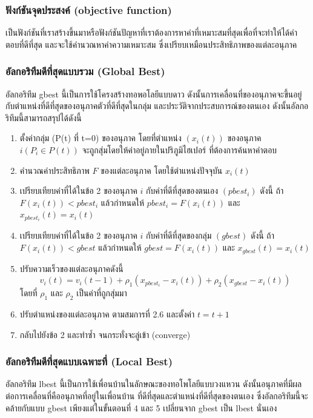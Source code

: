 \subsubsection{ฟังก์ชันจุดประสงค์ (objective function)}
เป็นฟังก์ชันที่เราสร้างขึ้นมาหรือฟังก์ชันปัญหาที่เราต้องการหาค่าที่เหมาะสมที่สุดเพื่อที่จะทำให้ได้คำตอบที่ดีที่สุด และจะใช้คำนวณหาค่าความเหมาะสม ซึ่งเปรียบเหมือนประสิทธิภาพของแต่ละอนุภาค

\subsubsection{อัลกอริทึมดีที่สุดแบบรวม (Global Best)}
อัลกอริทึม gbest นี้เป็นการใช้โครงสร้างทอพอโลยีแบบดาว ดังนั้นการเคลื่อนที่ของอนุภาคจะขึ้นอยู่กับตำแหน่งที่ดีที่สุดของอนุภาคตัวที่ดีที่สุดในกลุ่ม และประวัติจากประสบการณ์ของตนเอง ดังนั้นอัลกอริทึมนี้สามารถสรุปได้ดังนี้
\begin{enumerate}
\item ตั้งค่ากลุ่ม (P(t) ที่ t=0) ของอนุภาค โดยที่ตำแหน่ง \((x_{i}(t))\) ของอนุภาค \(i (P_{i} \in P(t))\) จะถูกสุ่มโดยให้ค่าอยู่ภายในปริภูมิไฮเปอร์ ที่ต้องการค้นหาคำตอบ
\item คำนวณค่าประสิทธิภาพ \(F\) ของแต่ละอนุภาค โดยใช้ตำแหน่งปัจจุบัน \(x_{i}(t)\)
\item เปรียบเทียบค่าที่ได้ในข้อ 2 ของอนุภาค \(i\) กับค่าที่ดีที่สุดของตนเอง \((pbest_{i})\) ดังนี้ ถ้า \(F(x_{i}(t)) < pbest_{i}\) แล้วกำหนดให้ \(pbest_{i} = F(x_{i}(t))\) และ \(x_{pbest_{i}}(t) = x_{i}(t)\)
\item เปรียบเทียบค่าที่ได้ในข้อ 2 ของอนุภาค \(i\) กับค่าที่ดีที่สุดของกลุ่ม \((gbest)\) ดังนี้ ถ้า \(F(x_{i}(t)) < gbest\) แล้วกำหนดให้ \(gbest = F(x_{i}(t))\) และ \(x_{gbest}(t) = x_{i}(t)\)
\item ปรับความเร็วของแต่ละอนุภาคดังนี้ \begin{equation}
  v_{i}(t) = v_{i}(t-1) + \rho_{1}(x_{pbest_{i}} - x_{i}(t)) + \rho_{2}(x_{gbest} - x_{i}(t))
\end{equation} โดยที่ \(\rho_{1}\) และ \(\rho_{2}\) เป็นค่าที่ถูกสุ่มมา
\item ปรับตำแหน่งของแต่ละอนุภาค ตามสมการที่ 2.6 และตั้งค่า \(t = t+1\)
\item กลับไปยังข้อ 2 และทำซ้ำ จนกระทั่งจะลู่เข้า (converge)
\end{enumerate}

\subsubsection{อัลกอริทึมดีที่สุดแบบเฉพาะที่ (Local Best)}
อัลกอริทึม lbest นี้เป็นการใช้เพื่อนบ้านในลักษณะของทอโพโลยีแบบวงแหวน ดังนั้นอนุภาคที่มีผลต่อการเคลื่อนที่คืออนุภาคที่อยู่ในเพื่อนบ้าน ที่ดีที่สุดและตำแหน่งที่ดีที่สุดของตนเอง ซึ่งอัลกอริทึมนี้จะคล้ายกับแบบ gbest เพียงแต่ในขั้นตอนที่ 4 และ 5 เปลี่ยนจาก gbest เป็น lbest นั่นเอง

